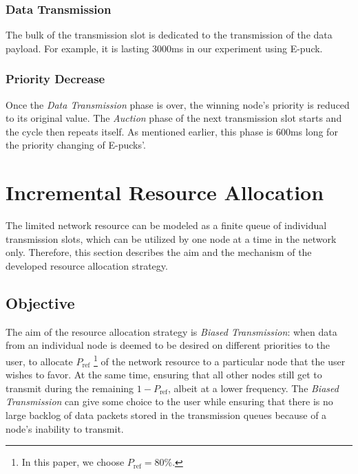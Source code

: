 \documentclass[journal]{IEEEtran}  %
\begin{document}
\subsubsection{Data Transmission}
The bulk of the transmission slot is dedicated to the transmission of the data
payload. For example, it is lasting 3000ms in our experiment using E-puck.

\subsubsection{Priority Decrease}
Once the \textit{Data Transmission} phase is over, the winning node's priority
is reduced to its original value. The \textit{Auction} phase of the next
transmission slot starts and the cycle then repeats itself.
As mentioned earlier, this phase is  600ms long for the
  priority changing of E-pucks'.

\section{Incremental Resource Allocation}
\label{sec:alg}
The limited network resource can be modeled as a finite queue of
individual transmission slots, which can be utilized by one node at a time
in the network only.
Therefore, this section describes the aim and the mechanism of the
developed resource allocation strategy.
\vspace{-0.3cm}
\subsection{Objective}
The aim of the resource allocation strategy is \textit{Biased Transmission}:
when data from an individual node is deemed to be desired on different
priorities to the user, to allocate $P_{\text{ref}}$ \footnote{In this paper,
  we choose $P_{\text{ref}}=80\%$.} of the network resource to a particular
  node that the user wishes to favor.  
At the same time, ensuring that all other nodes still get to transmit during
the remaining $1-P_{\text{ref}}$, albeit at a lower frequency. 
The \textit{Biased Transmission} can give some choice to the user while
ensuring that there is no large backlog of data packets stored in the
transmission queues because of a node's inability to transmit.
\end{document}
